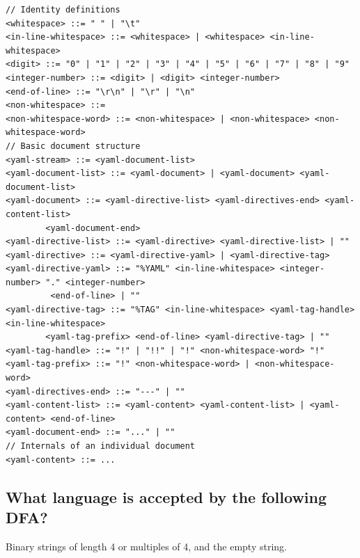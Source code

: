 \documentclass[a4paper]{exam}
\begin{document}
\begin{verbatim}
// Identity definitions
<whitespace> ::= " " | "\t"
<in-line-whitespace> ::= <whitespace> | <whitespace> <in-line-whitespace>
<digit> ::= "0" | "1" | "2" | "3" | "4" | "5" | "6" | "7" | "8" | "9"
<integer-number> ::= <digit> | <digit> <integer-number>
<end-of-line> ::= "\r\n" | "\r" | "\n"
<non-whitespace> ::=
<non-whitespace-word> ::= <non-whitespace> | <non-whitespace> <non-whitespace-word>
// Basic document structure
<yaml-stream> ::= <yaml-document-list>
<yaml-document-list> ::= <yaml-document> | <yaml-document> <yaml-document-list>
<yaml-document> ::= <yaml-directive-list> <yaml-directives-end> <yaml-content-list>
        <yaml-document-end>
<yaml-directive-list> ::= <yaml-directive> <yaml-directive-list> | ""
<yaml-directive> ::= <yaml-directive-yaml> | <yaml-directive-tag>
<yaml-directive-yaml> ::= "%YAML" <in-line-whitespace> <integer-number> "." <integer-number>
         <end-of-line> | ""
<yaml-directive-tag> ::= "%TAG" <in-line-whitespace> <yaml-tag-handle> <in-line-whitespace> 
        <yaml-tag-prefix> <end-of-line> <yaml-directive-tag> | ""
<yaml-tag-handle> ::= "!" | "!!" | "!" <non-whitespace-word> "!"
<yaml-tag-prefix> ::= "!" <non-whitespace-word> | <non-whitespace-word>
<yaml-directives-end> ::= "---" | ""
<yaml-content-list> ::= <yaml-content> <yaml-content-list> | <yaml-content> <end-of-line>
<yaml-document-end> ::= "..." | ""
// Internals of an individual document
<yaml-content> ::= ...
\end{verbatim}

\subsection{What language is accepted by the following DFA?}
\begin{solution}
    Binary strings of length 4 or multiples of 4, and the empty string.
\end{solution}
\end{document}
